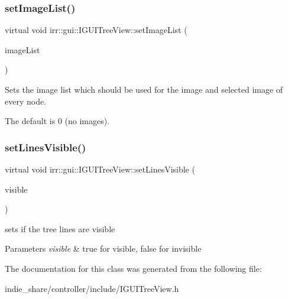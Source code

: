 \subsubsection{\texorpdfstring{set\+Image\+List()}{setImageList()}}
{\footnotesize\ttfamily virtual void irr\+::gui\+::\+I\+G\+U\+I\+Tree\+View\+::set\+Image\+List (\begin{DoxyParamCaption}\item[{\hyperlink{classirr_1_1gui_1_1IGUIImageList}{I\+G\+U\+I\+Image\+List} $\ast$}]{image\+List }\end{DoxyParamCaption})\hspace{0.3cm}{\ttfamily [pure virtual]}}



Sets the image list which should be used for the image and selected image of every node. 

The default is 0 (no images). \mbox{\label{classirr_1_1gui_1_1IGUITreeView_a7894df49d2f0f3d20e9e998ab1cac373}} 
\subsubsection{\texorpdfstring{set\+Lines\+Visible()}{setLinesVisible()}}
{\footnotesize\ttfamily virtual void irr\+::gui\+::\+I\+G\+U\+I\+Tree\+View\+::set\+Lines\+Visible (\begin{DoxyParamCaption}\item[{bool}]{visible }\end{DoxyParamCaption})\hspace{0.3cm}{\ttfamily [pure virtual]}}



sets if the tree lines are visible 


\begin{DoxyParams}{Parameters}
{\em visible} & true for visible, false for invisible \\
\hline
\end{DoxyParams}


The documentation for this class was generated from the following file\+:\begin{DoxyCompactItemize}
\item 
indie\+\_\+share/controller/include/I\+G\+U\+I\+Tree\+View.\+h\end{DoxyCompactItemize}
